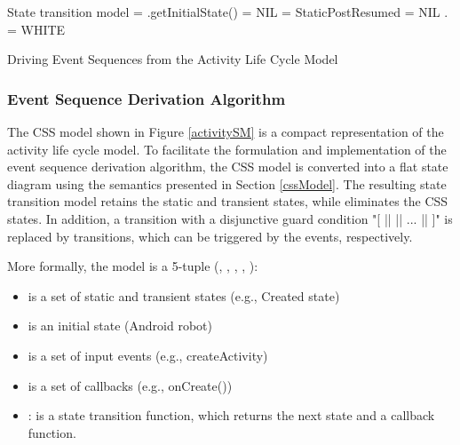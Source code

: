 \documentclass[10pt]{elsarticle}
\newlength{\algorithmwidth}
\begin{document}
\algnewcommand{}
\algnewcommand\INPUT{\item[\algorithmicinput]}


\def\therule{\makebox[\algorithmicindent][l]{\hspace*{.5em}\vrule height .75\baselineskip depth .25\baselineskip}}

\makeatother
\setlength{\algorithmwidth}{.9\textwidth}

\begin{algorithm}[ht]
 \begin{algorithmic}[1]
\INPUT 
\Statex  \Comment State transition model
 {}
	\State  = .getInitialState()  
	\State  = NIL 
	\State  = StaticPostResumed 
	\State  = NIL 
		\State . = WHITE
	\EndFor
\EndProcedure
  \end{algorithmic}
 \caption{Driving Event Sequences from the Activity Life Cycle Model}\label{eventDerivationActivity}
\end{algorithm}


\subsubsection{Event Sequence Derivation Algorithm}

The CSS model shown in Figure \ref{activitySM} is a compact representation of the activity life cycle model. To facilitate the formulation and implementation of the event sequence derivation algorithm, the CSS model is converted into a flat state diagram using the semantics presented in Section \ref{cssModel}. The resulting state transition model  retains the static and transient states, while eliminates the CSS states. In addition, a transition with a disjunctive guard condition "[ ||  || ... || ]" is replaced by  transitions, which can be triggered by the  events, respectively. 

More formally, the model  is a 5-tuple (, , , , ):

\begin{itemize}
\item  is a set of static and transient states (e.g., Created state)
\item  is an initial state (Android robot)
\item  is a set of input events (e.g., createActivity)
\item  is a set of callbacks (e.g., {\ttfamily onCreate()})
\item :        is a state transition function, which returns the next state and a callback function. 
\end{itemize}
\end{document}
